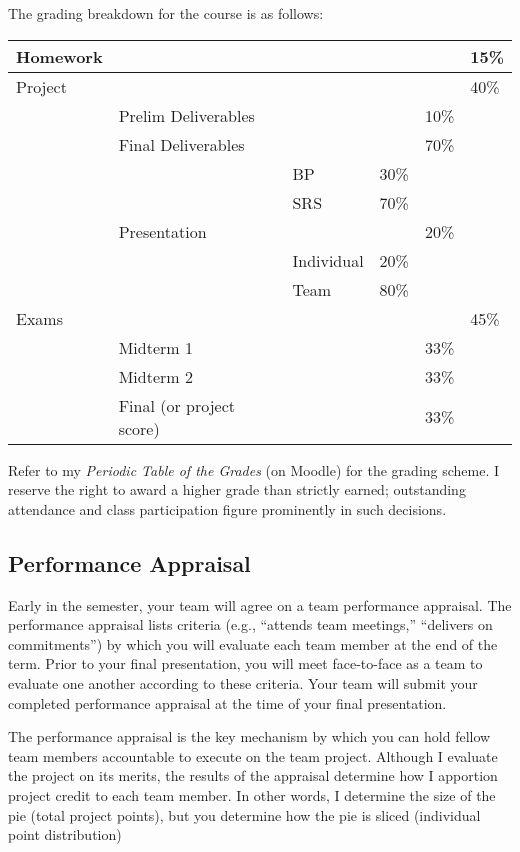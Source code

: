 \documentclass{article}
\begin{document}
The grading breakdown for the course is as follows:
\begin{center}
\begin{tabular}{llllll}
\hline
Homework &  &  &  &  & 15\%\\
\hline
Project &  &  &  &  & 40\%\\
 & Prelim Deliverables &  &  & 10\% & \\
 & Final Deliverables &  &  & 70\% & \\
 &  & BP & 30\% &  & \\
 &  & SRS & 70\% &  & \\
 & Presentation &  &  & 20\% & \\
 &  & Individual & 20\% &  & \\
 &  & Team & 80\% &  & \\
\hline
Exams &  &  &  &  & 45\%\\
 & Midterm 1 &  &  & 33\% & \\
 & Midterm 2 &  &  & 33\% & \\
 & Final (or project score) &  &  & 33\% & \\
\hline
\end{tabular}
\end{center}
Refer to my \emph{Periodic Table of the Grades} (on Moodle) for the grading scheme. I reserve
the right to award a higher grade than strictly earned; outstanding attendance and class
participation figure prominently in such decisions.
\subsection{Performance Appraisal}
\label{sec:orgheadline8}
Early in the semester, your team will agree on a team performance appraisal.
The performance appraisal lists criteria (e.g., ``attends team meetings,''
``delivers on commitments'') by which you will evaluate each team member
at the end of the term.
Prior to your final presentation,
you will meet face-to-face as a team to evaluate one another according to these criteria.
Your team will submit your completed performance appraisal
at the time of your final presentation.

The performance appraisal is the key mechanism
by which you can hold fellow team members accountable to execute on the team project.
Although I evaluate the project on its merits,
the results of the appraisal determine how I apportion project credit
to each team member.
In other words,
I determine the size of the pie (total project points),
but you determine how the pie is sliced (individual point distribution)
\end{document}
